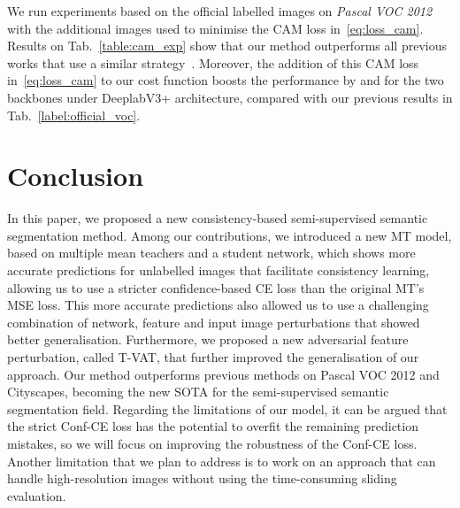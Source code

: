 \documentclass[10pt,twocolumn,letterpaper]{article}
\begin{document}
We run experiments based on the official  labelled images on \textit{Pascal VOC 2012} with the additional   images used to minimise the CAM loss in~\eqref{eq:loss_cam}. 
Results on Tab.~\ref{table:cam_exp} show that our method outperforms all  previous works that use a similar strategy~\cite{ouali2020semi, lai2021semi, zou2020pseudoseg}. 
Moreover, the addition of this CAM loss in~\eqref{eq:loss_cam} to our cost function boosts the performance by  and  for the two backbones under DeeplabV3+ architecture, compared with our previous results in Tab.~\ref{label:official_voc}. 

\vspace{-3pt}
\section{Conclusion}

In this paper, we proposed a new consistency-based semi-supervised semantic segmentation method. Among our contributions, we introduced a new MT model, based on multiple mean teachers and a student network, which shows more accurate predictions for unlabelled images that facilitate consistency learning, allowing us to use a stricter confidence-based CE loss than the original MT's MSE loss.
This more accurate predictions also allowed us to use a challenging combination of network, feature and input image perturbations that showed better generalisation.
Furthermore, we proposed a new adversarial feature perturbation, called T-VAT, that further improved the generalisation of our approach. 
Our method outperforms previous methods on Pascal VOC 2012 and Cityscapes, becoming the new SOTA for the semi-supervised semantic segmentation field. 
Regarding the limitations of our model, it can be argued that the strict Conf-CE loss has the potential to overfit the remaining prediction mistakes, so we will focus on improving the robustness of the Conf-CE loss.
Another limitation that we plan to address is to work on an approach that can handle  high-resolution images without using the time-consuming sliding evaluation.


{\small


}
\end{document}
